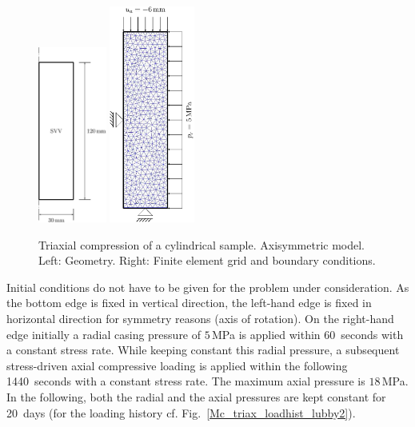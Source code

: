 \begin{figure}[!htb]
\begin{center}
\includegraphics[width=0.2\textwidth]{PART_II/M/svv_model.eps}
\hspace*{10.0ex}
\includegraphics[width=0.25\textwidth]{PART_II/M/svv_mesh.eps}
\end{center}
\caption{Triaxial compression of a cylindrical sample. Axisymmetric model. Left: Geometry. Right: Finite element grid and boundary conditions.} 
\label{Mc_triax_model_lubby2}
\end{figure}

Initial conditions do not have to be given for the problem under consideration. As the bottom edge is fixed in vertical direction, the left-hand edge is fixed in horizontal direction for symmetry reasons (axis of rotation). On the right-hand edge initially a radial casing pressure of $5\,$MPa is applied within 60~seconds with a constant stress rate. While keeping constant this radial pressure, a subsequent stress-driven axial compressive loading is applied within the following 1440~seconds with a constant stress rate. The maximum axial pressure is $18\,$MPa. In the following, both the radial and the axial pressures are kept constant for 20~days (for the loading history cf. Fig.~\ref{Mc_triax_loadhist_lubby2}).

